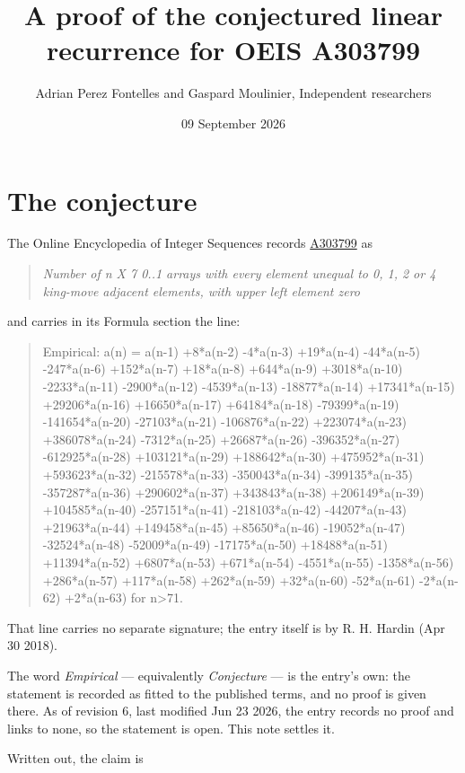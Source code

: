 \documentclass[11pt]{article}
\title{A proof of the conjectured linear recurrence for OEIS A303799}
\author{Adrian Perez Fontelles and Gaspard Moulinier, Independent researchers}
\date{09 September 2026}
\theoremstyle{definition}
\begin{document}
\maketitle
\section{The conjecture}

The Online Encyclopedia of Integer Sequences records \href{https://oeis.org/A303799}{A303799} as

\begin{quote}\itshape Number of n X 7 0..1 arrays with every element unequal to 0, 1, 2 or 4 king-move adjacent elements, with upper left element zero\end{quote}

and carries in its Formula section the line:

\begin{quote}\ttfamily Empirical: a(n) = a(n-1) +8*a(n-2) -4*a(n-3) +19*a(n-4) -44*a(n-5) -247*a(n-6) +152*a(n-7) +18*a(n-8) +644*a(n-9) +3018*a(n-10) -2233*a(n-11) -2900*a(n-12) -4539*a(n-13) -18877*a(n-14) +17341*a(n-15) +29206*a(n-16) +16650*a(n-17) +64184*a(n-18) -79399*a(n-19) -141654*a(n-20) -27103*a(n-21) -106876*a(n-22) +223074*a(n-23) +386078*a(n-24) -7312*a(n-25) +26687*a(n-26) -396352*a(n-27) -612925*a(n-28) +103121*a(n-29) +188642*a(n-30) +475952*a(n-31) +593623*a(n-32) -215578*a(n-33) -350043*a(n-34) -399135*a(n-35) -357287*a(n-36) +290602*a(n-37) +343843*a(n-38) +206149*a(n-39) +104585*a(n-40) -257151*a(n-41) -218103*a(n-42) -44207*a(n-43) +21963*a(n-44) +149458*a(n-45) +85650*a(n-46) -19052*a(n-47) -32524*a(n-48) -52009*a(n-49) -17175*a(n-50) +18488*a(n-51) +11394*a(n-52) +6807*a(n-53) +671*a(n-54) -4551*a(n-55) -1358*a(n-56) +286*a(n-57) +117*a(n-58) +262*a(n-59) +32*a(n-60) -52*a(n-61) -2*a(n-62) +2*a(n-63) for n>71.\end{quote}

That line carries no separate signature; the entry itself is by R. H. Hardin (Apr 30 2018).

The word {\itshape Empirical} --- equivalently {\itshape Conjecture} --- is the entry's own: the statement is recorded as fitted to the published terms, and no proof is given there. As of revision 6, last modified Jun 23 2026, the entry records no proof and links to none, so the statement is open. This note settles it.

Written out, the claim is
\end{document}
